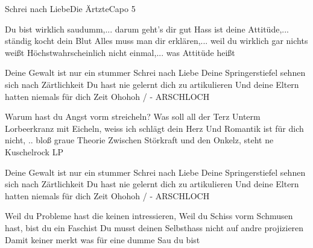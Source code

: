 \begin{song}{Schrei nach Liebe}{Die Ärtzte}{Capo 5}


Du bist wirklich saudumm,... darum geht's dir gut
Hass ist deine Attitüde,... ständig kocht dein Blut
Alles muss man dir erklären,... weil du wirklich gar nichts weißt
Höchstwahrscheinlich nicht einmal,... was Attitüde heißt

Deine Gewalt ist nur ein stummer Schrei nach Liebe
Deine Springerstiefel sehnen sich nach Zärtlichkeit
Du hast nie gelernt dich zu artikulieren
Und deine Eltern hatten niemals für dich Zeit 
Ohohoh / - ARSCHLOCH


Warum hast du Angst vorm streicheln?  Was soll all der Terz
Unterm Lorbeerkranz mit Eicheln, weiss ich schlägt dein Herz
Und Romantik ist für dich nicht, .. bloß graue Theorie
Zwischen Störkraft und den Onkelz, steht ne Kuschelrock LP

Deine Gewalt ist nur ein stummer Schrei nach Liebe
Deine Springerstiefel sehnen sich nach Zärtlichkeit
Du hast nie gelernt dich zu artikulieren
Und deine Eltern hatten niemals für dich Zeit
Ohohoh / - ARSCHLOCH


Weil du Probleme hast die keinen intressieren,
Weil du Schiss vorm Schmusen hast, bist du ein Faschist
Du musst deinen Selbsthass nicht auf andre projizieren
Damit keiner merkt was für eine dumme Sau du bist   


\end{song}
